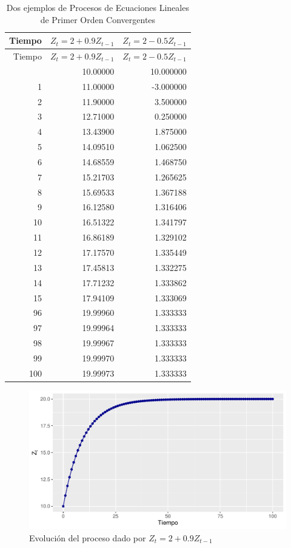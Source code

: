 \documentclass[
]{book}
\begin{document}
\begin{longtable}[]{@{}rrr@{}}
\caption{\label{tab:table1}Dos ejemplos de Procesos de Ecuaciones Lineales de Primer Orden Convergentes}\tabularnewline
\toprule\noalign{}
Tiempo & \(Z_t =2+0.9Z_{t-1}\) & \(Z_t = 2-0.5Z_{t-1}\) \\
\midrule\noalign{}
\endfirsthead
\toprule\noalign{}
Tiempo & \(Z_t =2+0.9Z_{t-1}\) & \(Z_t = 2-0.5Z_{t-1}\) \\
\midrule\noalign{}
\endhead
\bottomrule\noalign{}
\endlastfoot
0 & 10.00000 & 10.000000 \\
1 & 11.00000 & -3.000000 \\
2 & 11.90000 & 3.500000 \\
3 & 12.71000 & 0.250000 \\
4 & 13.43900 & 1.875000 \\
5 & 14.09510 & 1.062500 \\
6 & 14.68559 & 1.468750 \\
7 & 15.21703 & 1.265625 \\
8 & 15.69533 & 1.367188 \\
9 & 16.12580 & 1.316406 \\
10 & 16.51322 & 1.341797 \\
11 & 16.86189 & 1.329102 \\
12 & 17.17570 & 1.335449 \\
13 & 17.45813 & 1.332275 \\
14 & 17.71232 & 1.333862 \\
15 & 17.94109 & 1.333069 \\
96 & 19.99960 & 1.333333 \\
97 & 19.99964 & 1.333333 \\
98 & 19.99967 & 1.333333 \\
99 & 19.99970 & 1.333333 \\
100 & 19.99973 & 1.333333 \\
\end{longtable}

\begin{figure}

{\centering \includegraphics{bookdown-demo_files/figure-latex/fig21-1} 

}

\caption{Evolución del proceso dado por $Z_t =2+0.9Z_{t-1}$}\label{fig:fig21}
\end{figure}
\end{document}
